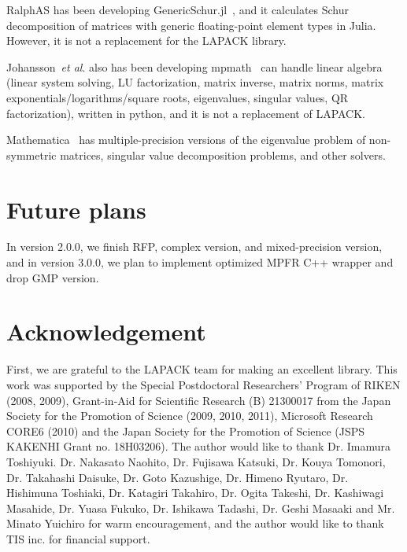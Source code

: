 \documentclass[12pt]{article}
\newcommand{\etal}{\textit{et al}.}
\begin{document}
RalphAS has been developing GenericSchur.jl~\cite{GenericSchur}, and it calculates Schur decomposition of matrices with generic floating-point element types in Julia. However, it is not a replacement for the LAPACK library.

Johansson~\etal{} also has been developing mpmath~\cite{mpmath} can handle linear algebra (linear system solving, LU factorization, matrix inverse, matrix norms, matrix exponentials/logarithms/square roots, eigenvalues, singular values, QR factorization), written in python, and it is not a replacement of LAPACK.

Mathematica~\cite{mathematica} has multiple-precision versions of the eigenvalue problem of non-symmetric matrices, singular value decomposition problems, and other solvers.

\section{Future plans}
\label{sec:futureplans}
In version 2.0.0, we finish RFP, complex version, and mixed-precision version, and in version 3.0.0, we plan to implement optimized MPFR C++ wrapper and drop GMP version.

\section*{Acknowledgement}

First, we are grateful to the LAPACK team for making an excellent library.
This work was supported by the Special Postdoctoral Researchers' Program of RIKEN (2008, 2009), Grant-in-Aid for Scientific Research (B) 21300017 from the Japan Society for the Promotion of Science (2009, 2010, 2011), Microsoft Research CORE6 (2010) and the Japan Society for the Promotion of Science (JSPS KAKENHI Grant no. 18H03206). 
The author would like to thank Dr. Imamura Toshiyuki. Dr. Nakasato Naohito, Dr. Fujisawa Katsuki, Dr. Kouya Tomonori, Dr. Takahashi Daisuke, Dr. Goto Kazushige, Dr. Himeno Ryutaro, Dr. Hishimuna Toshiaki, Dr. Katagiri Takahiro, Dr. Ogita Takeshi, Dr. Kashiwagi Masahide, Dr. Yuasa Fukuko, Dr. Ishikawa Tadashi, Dr. Geshi Masaaki and Mr. Minato Yuichiro for warm encouragement, and the author would like to thank TIS inc. for financial support.


\end{document}
